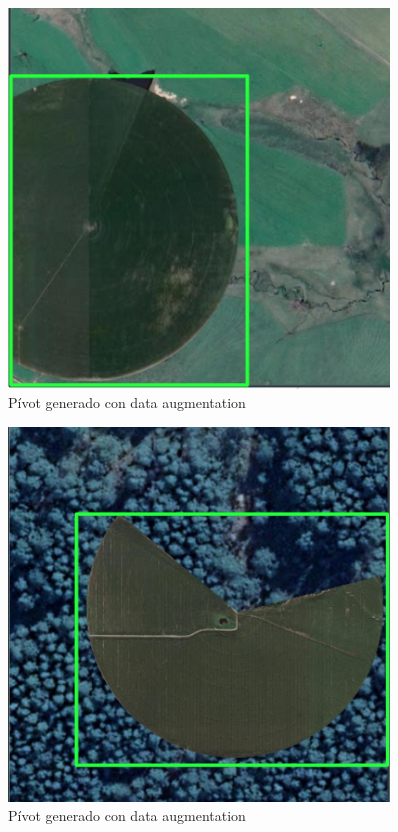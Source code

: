 \begin{figure}
    \centering
    \includegraphics[width=0.9\textwidth]{img/pivot data aug - 2.png}
    \caption{Pívot generado con data augmentation}
    \label{Pivot generado con data augmentation 2}
\end{figure}

\begin{figure}
    \centering
    \includegraphics[width=0.9\textwidth]{img/pivot data aug - 3.png}
    \caption{Pívot generado con data augmentation}
    \label{Pivot generado con data augmentation 3}
\end{figure}

